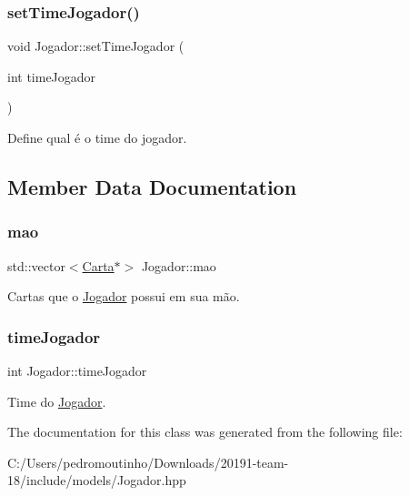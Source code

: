 \subsubsection{\texorpdfstring{setTimeJogador()}{setTimeJogador()}}
{\footnotesize\ttfamily void Jogador\+::set\+Time\+Jogador (\begin{DoxyParamCaption}\item[{int}]{time\+Jogador }\end{DoxyParamCaption})}



Define qual é o time do jogador. 



\subsection{Member Data Documentation}
\mbox{\label{class_jogador_ad989cab8e9aa172ddb6ed89d019a7e91}} 
\subsubsection{\texorpdfstring{mao}{mao}}
{\footnotesize\ttfamily std\+::vector$<$\mbox{\hyperlink{class_carta}{Carta}}$\ast$$>$ Jogador\+::mao\hspace{0.3cm}{\ttfamily [protected]}}



Cartas que o \mbox{\hyperlink{class_jogador}{Jogador}} possui em sua mão. 

\mbox{\label{class_jogador_a799f588b8a5c2504c6a290e617983808}} 
\subsubsection{\texorpdfstring{timeJogador}{timeJogador}}
{\footnotesize\ttfamily int Jogador\+::time\+Jogador\hspace{0.3cm}{\ttfamily [protected]}}



Time do \mbox{\hyperlink{class_jogador}{Jogador}}. 



The documentation for this class was generated from the following file\+:\begin{DoxyCompactItemize}
\item 
C\+:/\+Users/pedromoutinho/\+Downloads/20191-\/team-\/18/include/models/Jogador.\+hpp\end{DoxyCompactItemize}
